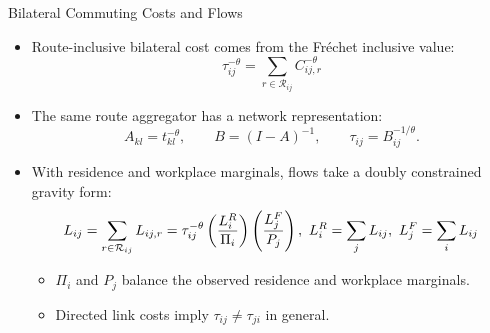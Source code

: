 \documentclass[11pt,aspectratio=169]{beamer}
\newcommand{\R}{\mathcal{R}}
\begin{document}
\begin{frame}[label=bilateral]{Bilateral Commuting Costs and Flows}
\begin{itemize}\footnotesize
  \item Route-inclusive bilateral cost comes from the Fr\'echet inclusive value:
  \vspace{-0.6em}\begin{equation}
    \tau_{ij}^{-\theta} = \sum_{r\in\R_{ij}} C_{ij,r}^{-\theta}
  \end{equation}
  \vspace{-0.8em}
  \item The same route aggregator has a network representation:
  \vspace{-0.55em}\begin{equation}\label{eq:inverse}
    A_{kl}=t_{kl}^{-\theta},\qquad B=(I-A)^{-1},\qquad \tau_{ij}=B_{ij}^{-1/\theta}.
  \end{equation}
  \vspace{-0.65em}
  \item With residence and workplace marginals, flows take a doubly constrained gravity form:
  \vspace{-0.55em}\begin{equation}\label{eq:gravity}
    L_{ij} = \sum_{r\in\R_{ij}}L_{ij,r} = \tau_{ij}^{-\theta} \left(\frac{L_i^R}{\Pi_i}\right) \left(\frac{L_j^F}{P_j}\right), \,\, L_i^R=\sum_jL_{ij}, \,\, L_j^F=\sum_iL_{ij}
  \vspace{-0.9em}\end{equation}
  \begin{itemize}
    \item $\Pi_i$ and $P_j$ balance the observed residence and workplace marginals.
    \item Directed link costs imply $\tau_{ij}\neq\tau_{ji}$ in general.
  \end{itemize}
\end{itemize}
\end{frame}
\end{document}
